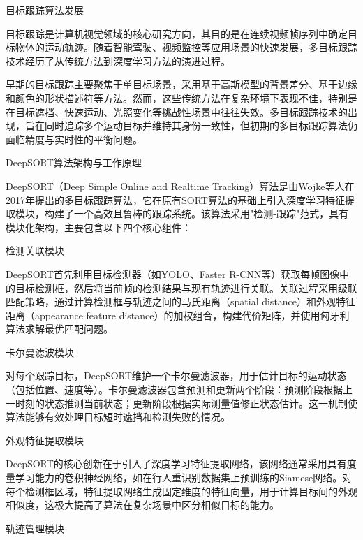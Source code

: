 \documentclass[a4paper, UTF8, fontsize=12pt]{ctexart} %
\numberwithin{equation}{section} %
\begin{document}
\begin{parlist}


\item 目标跟踪算法发展

目标跟踪是计算机视觉领域的核心研究方向，其目的是在连续视频帧序列中确定目标物体的运动轨迹。随着智能驾驶、视频监控等应用场景的快速发展，多目标跟踪技术经历了从传统方法到深度学习方法的演进过程。

早期的目标跟踪主要聚焦于单目标场景，采用基于高斯模型的背景差分、基于边缘和颜色的形状描述符等方法。然而，这些传统方法在复杂环境下表现不佳，特别是在目标遮挡、快速运动、光照变化等挑战性场景中往往失效。多目标跟踪技术的出现，旨在同时追踪多个运动目标并维持其身份一致性，但初期的多目标跟踪算法仍面临精度与实时性的平衡问题。


\item{DeepSORT算法架构与工作原理}

DeepSORT（Deep Simple Online and Realtime Tracking）算法是由Wojke等人在2017年提出的多目标跟踪算法\cite{wojke2017simple}，它在原有SORT算法的基础上引入深度学习特征提取模块，构建了一个高效且鲁棒的跟踪系统。该算法采用"检测-跟踪"范式，具有模块化架构，主要包含以下四个核心组件：

\begin{circledlist}
    \item 检测关联模块

    DeepSORT首先利用目标检测器（如YOLO、Faster R-CNN等）获取每帧图像中的目标检测框，然后将当前帧的检测结果与现有轨迹进行关联。关联过程采用级联匹配策略，通过计算检测框与轨迹之间的马氏距离（spatial distance）和外观特征距离（appearance feature distance）的加权组合，构建代价矩阵，并使用匈牙利算法求解最优匹配问题。

    \item 卡尔曼滤波模块

    对每个跟踪目标，DeepSORT维护一个卡尔曼滤波器，用于估计目标的运动状态（包括位置、速度等）。卡尔曼滤波器包含预测和更新两个阶段：预测阶段根据上一时刻的状态推测当前状态；更新阶段根据实际测量值修正状态估计。这一机制使算法能够有效处理目标短时遮挡和检测失败的情况。

    \item 外观特征提取模块

    DeepSORT的核心创新在于引入了深度学习特征提取网络，该网络通常采用具有度量学习能力的卷积神经网络，如在行人重识别数据集上预训练的Siamese网络。对每个检测框区域，特征提取网络生成固定维度的特征向量，用于计算目标间的外观相似度，这极大提高了算法在复杂场景中区分相似目标的能力。

    \item 轨迹管理模块


\end{circledlist}
\end{parlist}
\end{document}
